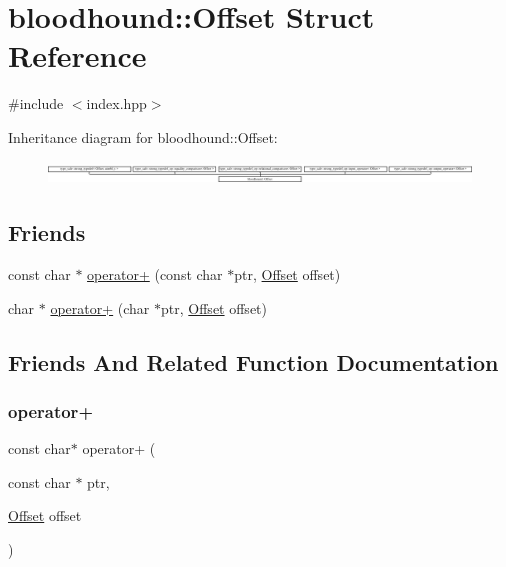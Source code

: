\hypertarget{structbloodhound_1_1Offset}{}\section{bloodhound\+:\+:Offset Struct Reference}
\label{structbloodhound_1_1Offset}


{\ttfamily \#include $<$index.\+hpp$>$}

Inheritance diagram for bloodhound\+:\+:Offset\+:\begin{figure}[H]
\begin{center}
\leavevmode
\includegraphics[height=0.598930cm]{structbloodhound_1_1Offset}
\end{center}
\end{figure}
\subsection*{Friends}
\begin{DoxyCompactItemize}
\item 
const char $\ast$ \hyperlink{structbloodhound_1_1Offset_aaed86d39530be98502fa1560b323d07b}{operator+} (const char $\ast$ptr, \hyperlink{structbloodhound_1_1Offset}{Offset} offset)
\item 
char $\ast$ \hyperlink{structbloodhound_1_1Offset_aec6c323c060e7a7cae481422f1ecea7a}{operator+} (char $\ast$ptr, \hyperlink{structbloodhound_1_1Offset}{Offset} offset)
\end{DoxyCompactItemize}


\subsection{Friends And Related Function Documentation}
\mbox{\label{structbloodhound_1_1Offset_aaed86d39530be98502fa1560b323d07b}} 
\subsubsection{\texorpdfstring{operator+}{operator+}\hspace{0.1cm}{\footnotesize\ttfamily [1/2]}}
{\footnotesize\ttfamily const char$\ast$ operator+ (\begin{DoxyParamCaption}\item[{const char $\ast$}]{ptr,  }\item[{\hyperlink{structbloodhound_1_1Offset}{Offset}}]{offset }\end{DoxyParamCaption})\hspace{0.3cm}{\ttfamily [friend]}}


